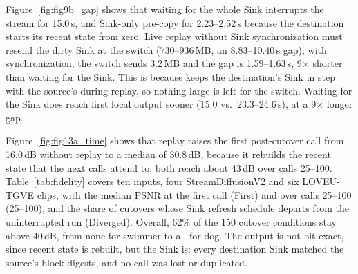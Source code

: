 Figure~\ref{fig:fig9b_gap} shows that waiting for the whole Sink interrupts the stream for 15.0\,s, and Sink-only
pre-copy for 2.23--2.52\,s because the destination starts its recent state from zero.
Live replay without Sink synchronization must resend the dirty Sink at the switch (730--936\,MB, an 8.83--10.40\,s gap);
with synchronization, the switch sends 3.2\,MB and the gap is 1.59--1.63\,s, 9$\times$ shorter than waiting for the Sink.
This is because \sys keeps the destination's Sink in step with the source's during replay, so nothing large is left
for the switch.
Waiting for the Sink does reach first local output sooner (15.0 vs.\ 23.3--24.6\,s), at a 9$\times$ longer gap.

Figure~\ref{fig:fig13a_time} shows that replay raises the first post-cutover call from 16.0\,dB without replay to a
median of 30.8\,dB, because it rebuilds the recent state that the next calls attend to; both reach about 43\,dB over
calls 25--100.
Table~\ref{tab:fidelity} covers ten inputs, four StreamDiffusionV2 and six LOVEU-TGVE clips, with the median PSNR at
the first call (First) and over calls 25--100 (25--100), and the share of cutovers whose Sink refresh schedule departs
from the uninterrupted run (Diverged).
Overall, 62\% of the 150 cutover conditions stay above 40\,dB, from none for swimmer to all for dog.
The output is not bit-exact, since recent state is rebuilt, but the Sink is: every destination Sink matched the
source's block digests, and no call was lost or duplicated.


